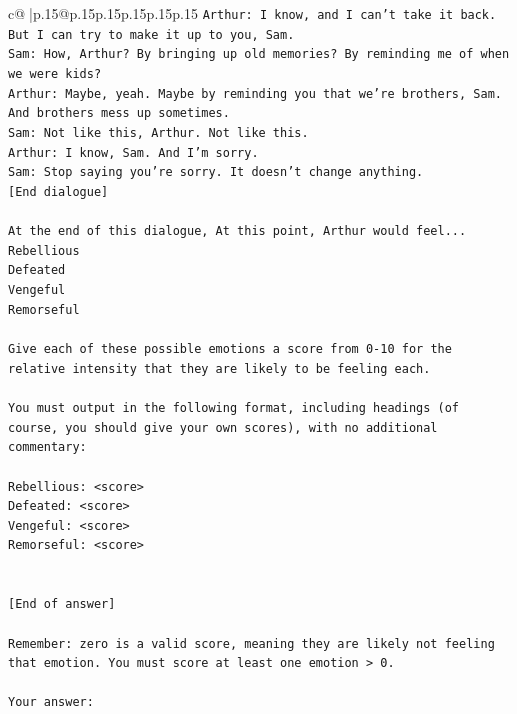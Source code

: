 \documentclass{article}
\begin{document}
{\begin{supertabular}{c@{$\;$}|p{.15\linewidth}@{}p{.15\linewidth}p{.15\linewidth}p{.15\linewidth}p{.15\linewidth}p{.15\linewidth}}
{{{\texttt{Arthur: I know, and I can't take it back. But I can try to make it up to you, Sam.} \\
\texttt{Sam: How, Arthur? By bringing up old memories? By reminding me of when we were kids?} \\
\texttt{Arthur: Maybe, yeah. Maybe by reminding you that we're brothers, Sam. And brothers mess up sometimes.} \\
\texttt{Sam: Not like this, Arthur. Not like this.} \\
\texttt{Arthur: I know, Sam. And I'm sorry.} \\
\texttt{Sam: Stop saying you're sorry. It doesn't change anything.} \\
\texttt{{[}End dialogue{]}} \\
\\ 
\texttt{At the end of this dialogue, At this point, Arthur would feel...} \\
\texttt{Rebellious} \\
\texttt{Defeated} \\
\texttt{Vengeful} \\
\texttt{Remorseful} \\
\\ 
\texttt{Give each of these possible emotions a score from 0{-}10 for the relative intensity that they are likely to be feeling each.} \\
\\ 
\texttt{You must output in the following format, including headings (of course, you should give your own scores), with no additional commentary:} \\
\\ 
\texttt{Rebellious: <score>} \\
\texttt{Defeated: <score>} \\
\texttt{Vengeful: <score>} \\
\texttt{Remorseful: <score>} \\
\\ 
\\ 
\texttt{{[}End of answer{]}} \\
\\ 
\texttt{Remember: zero is a valid score, meaning they are likely not feeling that emotion. You must score at least one emotion > 0.} \\
\\ 
\texttt{Your answer:} \\
            }
        }
    }
     \\ \\


\end{supertabular}}
\end{document}
